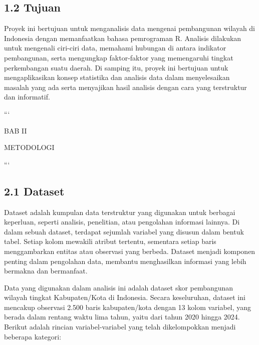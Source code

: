 \documentclass[
  12pt,
]{article}
\begin{document}
\subsection{\texorpdfstring{\normalsize 1.2 \hspace {0,5cm}
Tujuan}{1.2  Tujuan}}\label{tujuan}

\vspace{-0.5cm}

Proyek ini bertujuan untuk menganalisis data mengenai pembangunan
wilayah di Indonesia dengan memanfaatkan bahasa pemrograman R. Analisis
dilakukan untuk mengenali ciri-ciri data, memahami hubungan di antara
indikator pembangunan, serta mengungkap faktor-faktor yang memengaruhi
tingkat perkembangan suatu daerah. Di samping itu, proyek ini bertujuan
untuk mengaplikasikan konsep statistika dan analisis data dalam
menyelesaikan masalah yang ada serta menyajikan hasil analisis dengan
cara yang terstruktur dan informatif.

\setcounter{page}{1}
\newpage

\begin{center}
{
\bfseries

```
\vfill

\Large

BAB II

METODOLOGI

```

}
\end{center}

\subsection{\texorpdfstring{\normalsize 2.1 \hspace {0,5cm}
Dataset}{2.1  Dataset}}\label{dataset}

\vspace{-0.5cm}

Dataset adalah kumpulan data terstruktur yang digunakan untuk berbagai
keperluan, seperti analisis, penelitian, atau pengolahan informasi
lainnya. Di dalam sebuah dataset, terdapat sejumlah variabel yang
disusun dalam bentuk tabel. Setiap kolom mewakili atribut tertentu,
sementara setiap baris menggambarkan entitas atau observasi yang
berbeda. Dataset menjadi komponen penting dalam pengolahan data,
membantu menghasilkan informasi yang lebih bermakna dan bermanfaat.

Data yang digunakan dalam analisis ini adalah dataset skor pembangunan
wilayah tingkat Kabupaten/Kota di Indonesia. Secara keseluruhan, dataset
ini mencakup observasi 2.500 baris kabupaten/kota dengan 13 kolom
variabel, yang berada dalam rentang waktu lima tahun, yaitu dari tahun
2020 hingga 2024. Berikut adalah rincian variabel-variabel yang telah
dikelompokkan menjadi beberapa kategori:
\end{document}
